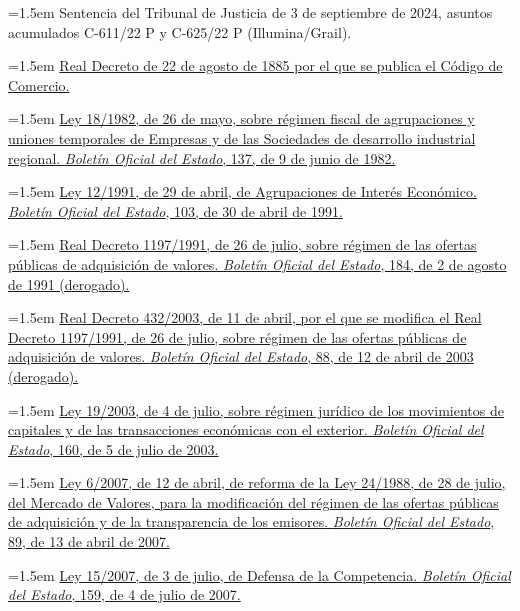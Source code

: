 \documentclass[10pt,a4paper]{article}
\begin{document}
\noindent\hangindent=1.5em Sentencia del Tribunal de Justicia de 3 de septiembre de 2024, asuntos acumulados C-611/22 P y C-625/22 P (Illumina/Grail).

\noindent\hangindent=1.5em \href{https://www.boe.es/buscar/act.php?id=BOE-A-1885-6627}{Real Decreto de 22 de agosto de 1885 por el que se publica el Código de Comercio.}

\noindent\hangindent=1.5em \href{https://www.boe.es/eli/es/l/1982/05/26/18/con}{Ley 18/1982, de 26 de mayo, sobre régimen fiscal de agrupaciones y uniones temporales de Empresas y de las Sociedades de desarrollo industrial regional. \textit{Boletín Oficial del Estado}, 137, de 9 de junio de 1982.}

\noindent\hangindent=1.5em \href{https://www.boe.es/eli/es/l/1991/04/29/12/con}{Ley 12/1991, de 29 de abril, de Agrupaciones de Interés Económico. \textit{Boletín Oficial del Estado}, 103, de 30 de abril de 1991.}

\noindent\hangindent=1.5em \href{https://www.boe.es/eli/es/rd/1991/07/26/1197}{Real Decreto 1197/1991, de 26 de julio, sobre régimen de las ofertas públicas de adquisición de valores. \textit{Boletín Oficial del Estado}, 184, de 2 de agosto de 1991 (derogado).}

\noindent\hangindent=1.5em \href{https://www.boe.es/eli/es/rd/2003/04/11/432}{Real Decreto 432/2003, de 11 de abril, por el que se modifica el Real Decreto 1197/1991, de 26 de julio, sobre régimen de las ofertas públicas de adquisición de valores. \textit{Boletín Oficial del Estado}, 88, de 12 de abril de 2003 (derogado).}

\noindent\hangindent=1.5em \href{https://www.boe.es/eli/es/l/2003/07/04/19/con}{Ley 19/2003, de 4 de julio, sobre régimen jurídico de los movimientos de capitales y de las transacciones económicas con el exterior. \textit{Boletín Oficial del Estado}, 160, de 5 de julio de 2003.}

\noindent\hangindent=1.5em \href{https://www.boe.es/eli/es/l/2007/04/12/6}{Ley 6/2007, de 12 de abril, de reforma de la Ley 24/1988, de 28 de julio, del Mercado de Valores, para la modificación del régimen de las ofertas públicas de adquisición y de la transparencia de los emisores. \textit{Boletín Oficial del Estado}, 89, de 13 de abril de 2007.}

\noindent\hangindent=1.5em \href{https://www.boe.es/eli/es/l/2007/07/03/15/con}{Ley 15/2007, de 3 de julio, de Defensa de la Competencia. \textit{Boletín Oficial del Estado}, 159, de 4 de julio de 2007.}
\end{document}
